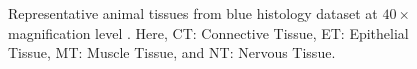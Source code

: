 \begin{itemize}
\begin{figure}
\centering
         \hspace{1mm}
            \hspace{1 mm}
         \hspace{1mm}
  \caption[Representative animal tissues from blue histology dataset at $40 \times$  magnification level]{\fontsize{10}{12}\selectfont Representative animal tissues from blue histology dataset at $40 \times$  magnification level \cite{BlueHist:online}. Here, CT: Connective Tissue, ET: Epithelial Tissue, MT: Muscle Tissue, and NT: Nervous Tissue.}
\label{ch3:fig:tissue}
\end{figure}


\end{itemize}

